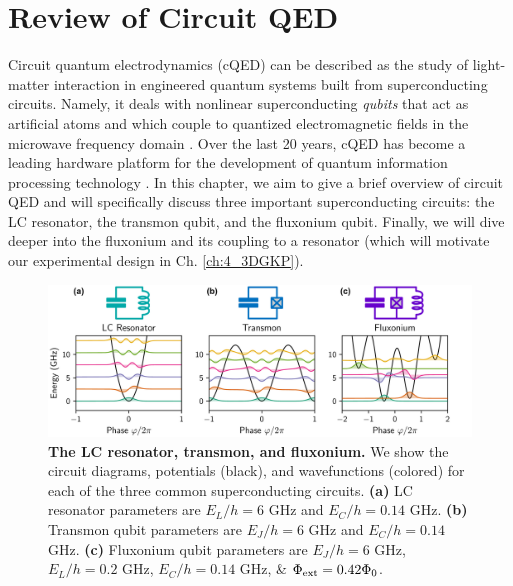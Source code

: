 \chapter{Review of Circuit QED \label{ch:3_cQED}}

Circuit quantum electrodynamics (cQED) can be described as the study of light-matter interaction in engineered quantum systems built from superconducting circuits. Namely, it deals with nonlinear superconducting \textit{qubits} that act as artificial atoms and which couple to quantized electromagnetic fields in the microwave frequency domain \cite{blais2004cavity}. Over the last 20 years, cQED has become a leading hardware platform for the development of quantum information processing technology \cite{devoret2004superconducting, devoret2013superconducting, girvin2014circuit, krantz2019quantum, kjaergaard2020superconducting, blais2020quantum, blais2021circuit}. In this chapter, we aim to give a brief overview of circuit QED and will specifically discuss three important superconducting circuits: the LC resonator, the transmon qubit, and the fluxonium qubit. Finally, we will dive deeper into the fluxonium and its coupling to a resonator (which will motivate our experimental design in Ch. \ref{ch:4_3DGKP}). 

\begin{figure}[h]
    \centering
    \includegraphics[width=\linewidth]{Figures/3/Circuit_QED_Overview.pdf}
    \caption[Overview of Circuit QED, showing the circuit diagrams, potentials, and wavefunctions for the LC Resonator, the transmon Qubit, and the fluxonium qubit.]{\textbf{The LC resonator, transmon, and fluxonium.} We show the circuit diagrams, potentials (black), and wavefunctions (colored) for each of the three common superconducting circuits. \textbf{(a)} LC resonator parameters are $E_L/h = 6$ GHz and $E_C/h = 0.14$ GHz. \textbf{(b)} Transmon qubit parameters are $E_J/h = 6$ GHz and $E_C/h = 0.14$ GHz. \textbf{(c)} Fluxonium qubit parameters are $E_J/h = 6$ GHz,  $E_L/h = 0.2$ GHz, $E_C/h = 0.14$ GHz, \& $\Phi_{\rm ext} = 0.42\Phi_0$.}
    \label{fig:3_Circuit_QED_Overview}
\end{figure}
\clearpage

